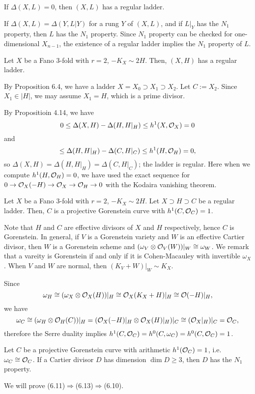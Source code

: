 \documentclass{../../small}
\begin{document}
\begin{rmk}
If $\Delta(X,L)=0$, then $(X,L)$ has a regular ladder.
\end{rmk}
\begin{rmk}
If $\Delta(X,L)=\Delta(Y,L|Y)$ for a rung $Y$ of $(X,L)$, and if $L|_Y$	has the $N_1$ property, then $L$ has the $N_1$ property.
Since $N_1$ property can be checked for one-dimensional $X_{n-1}$, the existence of a regular ladder implies the $N_1$ property of $L$.
\end{rmk}
\begin{prop}
Let $X$ be a Fano 3-fold with $r=2$, $-K_X\sim2H$.
Then, $(X,H)$ has a regular ladder.
\end{prop}
\begin{pf}
By Proposition 6.4, we have a ladder $X=X_0\supset X_1\supset X_2$.
Let $C:=X_2$.
Since $X_1\in|H|$, we may assume $X_1=H$, which is a prime divisor.

By Propositioin 4.14, we have
\[0\le\Delta(X,H)-\Delta(H,H|_H)\le h^1(X,\mathcal{O}_X)=0\]
and
\[\le\Delta(H,H|_H)-\Delta(C,H|_C)\le h^1(H,\mathcal{O}_H)=0,\]
so $\Delta(X,H)=\Delta(H,H|_H)=\Delta(C,H|_C)$; the ladder is regular.
Here when we compute $h^1(H,\mathcal{O}_H)=0$, we have used the exact sequence for $0\to\mathcal{O}_X(-H)\to\mathcal{O}_X\to\mathcal{O}_H\to0$ with the Kodaira vanishing theorem.
\end{pf}

\begin{prop}
Let $X$ be a Fano 3-fold with $r=2$, $-K_X\sim2H$.
Let $X\supset H\supset C$ be a regular ladder.
Then, $C$ is a projective Gorenstein curve with $h^1(C,\mathcal{O}_C)=1$.
\end{prop}
\begin{pf}
Note that $H$ and $C$ are effective divisors of $X$ and $H$ respectively, hence $C$ is Gorenstein.
In general, if $V$ is a Gorenstein variety and $W$ is an effective Cartier divisor, then $W$ is a Gorenstein scheme and $(\omega_V\otimes \mathcal{O}_V(W))|_W\cong\omega_W$.
We remark that a vareity is Gorenstein if and only if it is Cohen-Macauley with invertible $\omega_X$.
When $V$ and $W$ are normal, then $(K_V+W)|_W\sim K_X$.

Since
\[\omega_H\cong(\omega_X\otimes\mathcal{O}_X(H))|_H\cong\mathcal{O}_X(K_X+H)|_H\cong\mathcal{O}(-H)|_H,\]
we have
\[\omega_C\cong(\omega_H\otimes\mathcal{O}_H(C))|_H=(\mathcal{O}_X(-H)|_H\otimes\mathcal{O}_X(H)|_H)|_C\cong(\mathcal{O}_X|_H)|_C=\mathcal{O}_C,\]
therefore the Serre duality implies $h^1(C,\mathcal{O}_C)=h^0(C,\omega_C)=h^0(C,\mathcal{O}_C)=1$.
\end{pf}

\begin{prop}
Let $C$ be a projective Gorenstein curve with arithmetic $h^1(\mathcal{O}_C)=1$, i.e. $\omega_C\cong\mathcal{O}_C$.
If a Cartier divisor $D$ has dimension $\dim D\ge3$, then $D$ has the $N_1$ property.
\end{prop}
We will prove (6.11)$\Rightarrow$(6.13)$\Rightarrow$(6.10).
\end{document}
